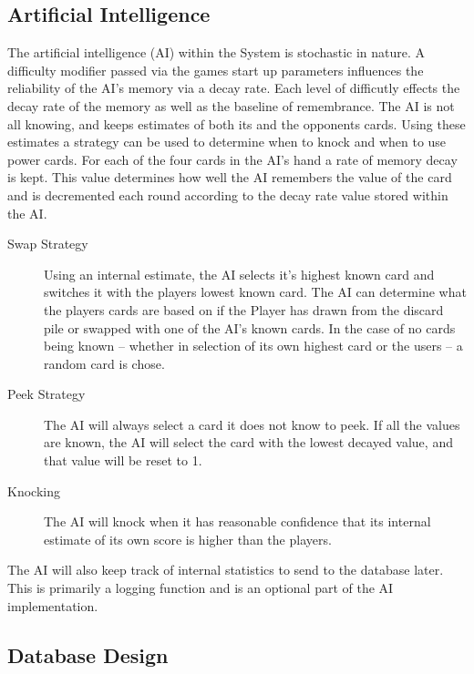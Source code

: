\documentclass[12pt]{IEEEtran}
\begin{document}
\subsection{Artificial Intelligence}
\label{subsec:ai}

	The artificial intelligence (AI) within the System is stochastic in nature. A difficulty modifier passed via the games start up parameters influences the reliability of the AI's memory via a decay rate. Each level of 		difficutly effects the decay rate of the memory as well as the baseline of remembrance. The AI is not all knowing, and keeps estimates of both its and the opponents cards. Using these estimates a strategy can 		be used to determine when to knock and when to use power cards. For each of the four cards in the AI's hand a rate of memory decay is kept. This value determines how well the AI remembers the value of the 		card and is decremented each round according to the decay rate value stored within the AI.

	\begin{description}
		\item[Swap Strategy] \hspace{3em} Using an internal estimate, the AI selects it's highest known card and switches it with the players lowest known card. The AI can determine what the players cards are 			based	on if the Player has drawn from the discard pile or swapped with one of the AI's known cards. In the case of no cards being known -- whether in selection of its own highest card or the users -- a 			random card is chose. 
		\item[Peek Strategy] \hspace{3em} The AI will always select a card it does not know to peek. If all the values are known, the AI will select the card with the lowest decayed value, and that value will be 			reset to 1.
		\item[Knocking] \hspace{3em}  The AI will knock when it has reasonable confidence that its internal estimate of its own score is higher than the players.
	\end{description}

	The AI will also keep track of internal statistics to send to the database later. This is primarily a logging function and is an optional part of the AI implementation.

\subsection{Database Design}
\label{subsec:dbdesign}
\end{document}
